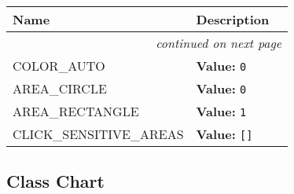     \vspace{-1cm}
\hspace{\varindent}\begin{longtable}{|p{\varnamewidth}|p{\vardescrwidth}|l}
\cline{1-2}
\cline{1-2} \centering \textbf{Name} & \centering \textbf{Description}& \\
\cline{1-2}
\endhead\cline{1-2}\multicolumn{3}{r}{\small\textit{continued on next page}}\\\endfoot\cline{1-2}
\endlastfoot\raggedright C\-O\-L\-O\-R\-\_\-A\-U\-T\-O\- & \raggedright \textbf{Value:} 
{\tt 0}&\\
\cline{1-2}
\raggedright A\-R\-E\-A\-\_\-C\-I\-R\-C\-L\-E\- & \raggedright \textbf{Value:} 
{\tt 0}&\\
\cline{1-2}
\raggedright A\-R\-E\-A\-\_\-R\-E\-C\-T\-A\-N\-G\-L\-E\- & \raggedright \textbf{Value:} 
{\tt 1}&\\
\cline{1-2}
\raggedright C\-L\-I\-C\-K\-\_\-S\-E\-N\-S\-I\-T\-I\-V\-E\-\_\-A\-R\-E\-A\-S\- & \raggedright \textbf{Value:} 
{\tt \texttt{[}\texttt{]}}&\\
\cline{1-2}
\end{longtable}



\subsection{Class Chart}

